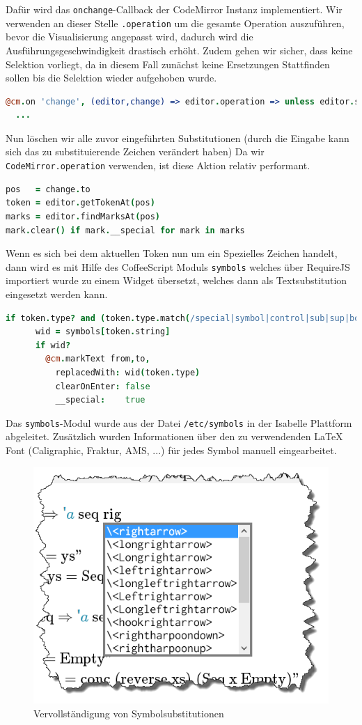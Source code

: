 Dafür wird das \texttt{onchange}-Callback der CodeMirror Instanz implementiert. Wir verwenden an
dieser Stelle \texttt{.operation} um die gesamte Operation auszuführen, bevor die Visualisierung
angepasst wird, dadurch wird die Ausführungsgeschwindigkeit drastisch erhöht. Zudem gehen wir
sicher, dass keine Selektion vorliegt, da in diesem Fall zunächst keine Ersetzungen Stattfinden
sollen bis die Selektion wieder aufgehoben wurde.

\begin{lstlisting}[language=coffee]
@cm.on 'change', (editor,change) => editor.operation => unless editor.somethingSelected()
  ...
\end{lstlisting}

Nun löschen wir alle zuvor eingeführten Substitutionen (durch die Eingabe kann sich das zu
substituierende Zeichen verändert haben) Da wir \texttt{CodeMirror.operation} verwenden, ist diese
Aktion relativ performant.

\begin{lstlisting}[language=coffee]
pos   = change.to
token = editor.getTokenAt(pos)          
marks = editor.findMarksAt(pos)
mark.clear() if mark.__special for mark in marks 
\end{lstlisting}

Wenn es sich bei dem aktuellen Token nun um ein Spezielles Zeichen handelt, dann wird es mit Hilfe
des CoffeeScript Moduls \texttt{symbols} welches über RequireJS importiert wurde zu einem Widget
übersetzt, welches dann als Textsubstitution eingesetzt werden kann.

\begin{lstlisting}[language=coffee]
    if token.type? and (token.type.match(/special|symbol|control|sub|sup|bold/))
      wid = symbols[token.string]
      if wid?
        @cm.markText from,to,          
          replacedWith: wid(token.type)
          clearOnEnter: false
          __special:    true
\end{lstlisting}

Das \texttt{symbols}-Modul wurde aus der Datei \texttt{/etc/symbols} in der Isabelle Plattform
abgeleitet. Zusätzlich wurden Informationen über den zu verwendenden LaTeX Font (Caligraphic,
Fraktur, AMS, ...) für jedes Symbol manuell eingearbeitet.

\begin{figure}[ht]
\centering
\includegraphics[width=0.5\linewidth]{images/completion}
  \caption{Vervollständigung von Symbolsubstitutionen}
  \label{fig:subst}
\end{figure}


